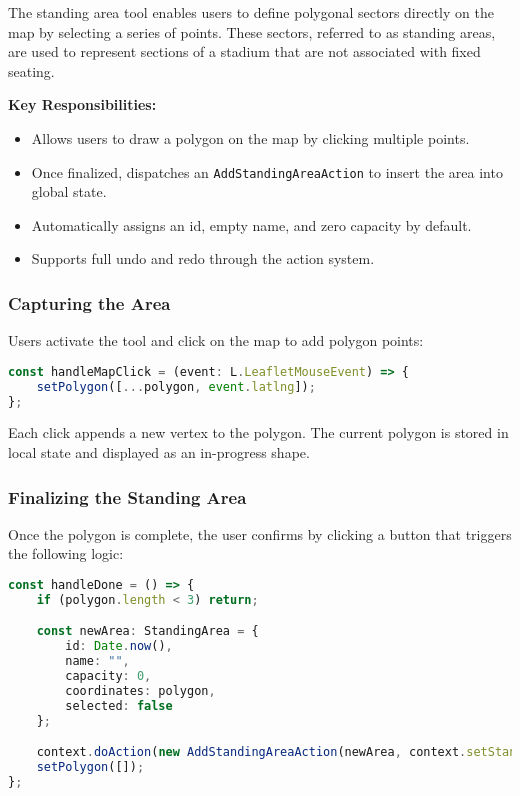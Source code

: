 The standing area tool enables users to define polygonal sectors directly on the map by selecting a series of points. These sectors, referred to as standing areas, are used to represent sections of a stadium that are not associated with fixed seating.

\textbf{Key Responsibilities:}
\begin{itemize}
    \item Allows users to draw a polygon on the map by clicking multiple points.
    \item Once finalized, dispatches an \texttt{AddStandingAreaAction} to insert the area into global state.
    \item Automatically assigns an id, empty name, and zero capacity by default.
    \item Supports full undo and redo through the action system.
\end{itemize}

\subsubsection{Capturing the Area}
Users activate the tool and click on the map to add polygon points:

\begin{lstlisting}[language=TypeScript, caption=Adding Polygon Points, label=lst:standingarea-add-point]
const handleMapClick = (event: L.LeafletMouseEvent) => {
    setPolygon([...polygon, event.latlng]);
};
\end{lstlisting}

Each click appends a new vertex to the polygon. The current polygon is stored in local state and displayed as an in-progress shape.

\subsubsection{Finalizing the Standing Area}
Once the polygon is complete, the user confirms by clicking a button that triggers the following logic:

\begin{lstlisting}[language=TypeScript, caption=Finalizing Standing Area, label=lst:standingarea-finalize]
const handleDone = () => {
    if (polygon.length < 3) return;

    const newArea: StandingArea = {
        id: Date.now(),
        name: "",
        capacity: 0,
        coordinates: polygon,
        selected: false
    };

    context.doAction(new AddStandingAreaAction(newArea, context.setStandingAreas));
    setPolygon([]);
};
\end{lstlisting}

